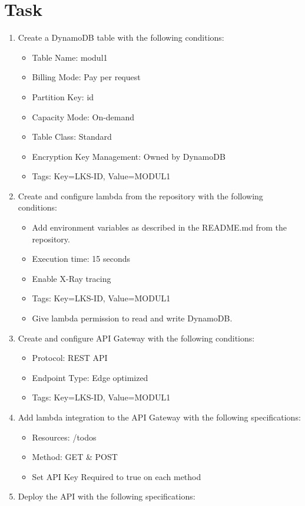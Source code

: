 \documentclass{article}
\begin{document}
\section{Task}
\begin{enumerate}
\item Create a DynamoDB table with the following conditions:
\begin{itemize}
    \item Table Name: modul1
    \item Billing Mode: Pay per request
    \item Partition Key: id
    \item Capacity Mode: On-demand
    \item Table Class: Standard
    \item Encryption Key Management: Owned by DynamoDB
    \item Tags: Key=LKS-ID, Value=MODUL1
\end{itemize}
\item Create and configure lambda from the repository with the following conditions:
\begin{itemize}
    \item Add environment variables as described in the README.md from the repository.
    \item Execution time: 15 seconds
    \item Enable X-Ray tracing
    \item Tags: Key=LKS-ID, Value=MODUL1
    \item Give lambda permission to read and write DynamoDB.
\end{itemize}
\item Create and configure API Gateway with the following conditions:
\begin{itemize}
    \item Protocol: REST API
    \item Endpoint Type: Edge optimized
    \item Tags: Key=LKS-ID, Value=MODUL1
\end{itemize}
\item Add lambda integration to the API Gateway with the following specifications:
\begin{itemize}
    \item Resources: /todos
    \item Method: GET \& POST
    \item Set API Key Required to true on each method
\end{itemize}
\item Deploy the API with the following specifications:

\end{enumerate}
\end{document}
